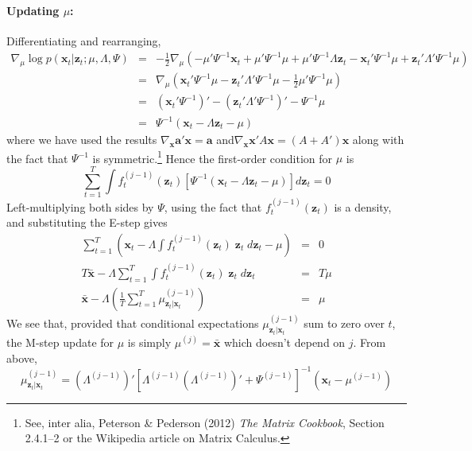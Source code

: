 \paragraph{Updating $\mu$:} Differentiating and rearranging, 
 \begin{eqnarray*}
 	\nabla_\mu \log p(\mathbf{x}_t|\mathbf{z}_t;\mu, \Lambda, \Psi) &=& -\frac{1}{2} \nabla_\mu \left( -\mu' \Psi^{-1} \mathbf{x}_t + \mu' \Psi^{-1}\mu + \mu' \Psi^{-1} \Lambda \mathbf{z}_t - \mathbf{x}_t' \Psi^{-1} \mu +  \mathbf{z}_t'\Lambda' \Psi^{-1} \mu  \right)\\
 		&=& \nabla_\mu \left(\mathbf{x}_t' \Psi^{-1} \mu - \mathbf{z}_t' \Lambda' \Psi^{-1}\mu - \frac{1}{2} \mu' \Psi^{-1} \mu \right)\\
 		&=& \left(\mathbf{x}_t' \Psi^{-1}\right)' - \left(\mathbf{z}_t'\Lambda'\Psi^{-1}\right)' - \Psi^{-1}\mu\\
 		&=& \Psi^{-1}\left(\mathbf{x}_t  - \Lambda\mathbf{z}_t - \mu\right)
 \end{eqnarray*}
where we have used the results $\nabla_{\mathbf{x}}\mathbf{a}' \mathbf{x} = \mathbf{a}$ and$\nabla_{\mathbf{x}}\mathbf{x}'A \mathbf{x} = (A + A')\mathbf{x}$ along with the fact that $\Psi^{-1}$ is symmetric.\footnote{See, inter alia, Peterson \& Pederson (2012) \emph{The Matrix Cookbook}, Section 2.4.1--2 or the Wikipedia article on Matrix Calculus.} Hence the first-order condition for $\mu$ is
$$\sum_{t = 1}^T \int f_t^{(j-1)}(\mathbf{z}_t) \left[\Psi^{-1}\left(\mathbf{x}_t  - \Lambda\mathbf{z}_t - \mu\right) \right] d \mathbf{z}_t = 0$$
Left-multiplying both sides by $\Psi$, using the fact that $f_t^{(j-1)}(\mathbf{z}_t)$ is a density, and substituting the E-step gives
	\begin{eqnarray*}
		\sum_{t = 1}^T \left( \mathbf{x}_t - \Lambda \int f_t^{(j-1)}(\mathbf{z}_t) \; \mathbf{z}_t \; d \mathbf{z}_t - \mu\right)   &=& 0\\
 T\bar{\mathbf{x}} - \Lambda \sum_{t = 1}^T \int f_t^{(j-1)}(\mathbf{z}_t) \; \mathbf{z}_t \; d\mathbf{z}_t &=& T \mu \\
 	\bar{\mathbf{x}}  - \Lambda \left( \frac{1}{T} \sum_{t=1}^T \mu^{(j-1)}_{\mathbf{z}_t|\mathbf{x}_t} \right) &=& \mu
	\end{eqnarray*}
We see that, provided that conditional expectations $\mu^{(j-1)}_{\mathbf{z}_t|\mathbf{x}_t}$ sum to zero over $t$, the M-step update for $\mu$ is simply $\mu^{(j)} = \bar{\mathbf{x}}$ which doesn't depend on $j$. From above, 
	$$\mu^{(j-1)}_{\mathbf{z}_t|\mathbf{x}_t} = \left(\Lambda^{(j-1)}\right)' \left[\Lambda^{(j-1)} \left(\Lambda^{(j-1)}\right)' + \Psi^{(j-1)}\right]^{-1} \left(\mathbf{x}_t - \mu^{(j-1)}\right)$$
